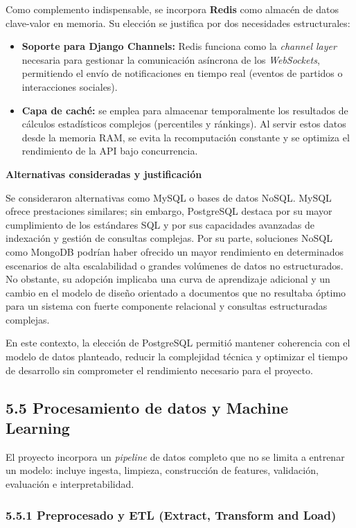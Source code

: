Como complemento indispensable, se incorpora \textbf{Redis} como almacén de datos clave-valor en memoria. Su elección se justifica por dos necesidades estructurales:
\begin{itemize}
    \item \textbf{Soporte para Django Channels:} Redis funciona como la \textit{channel layer} necesaria para gestionar la comunicación asíncrona de los \textit{WebSockets}, permitiendo el envío de notificaciones en tiempo real (eventos de partidos o interacciones sociales).
    \item \textbf{Capa de caché:} se emplea para almacenar temporalmente los resultados de cálculos estadísticos complejos (percentiles y ránkings). Al servir estos datos desde la memoria RAM, se evita la recomputación constante y se optimiza el rendimiento de la API bajo concurrencia.
\end{itemize}

\textbf{Alternativas consideradas y justificación}

Se consideraron alternativas como MySQL o bases de datos NoSQL. MySQL ofrece prestaciones similares; 
sin embargo, PostgreSQL destaca por su mayor cumplimiento de los estándares SQL y por sus capacidades 
avanzadas de indexación y gestión de consultas complejas. Por su parte, soluciones NoSQL como MongoDB 
podrían haber ofrecido un mayor rendimiento en determinados escenarios de alta escalabilidad o grandes 
volúmenes de datos no estructurados. No obstante, su adopción implicaba una curva de aprendizaje 
adicional y un cambio en el modelo de diseño orientado a documentos que no resultaba óptimo para un 
sistema con fuerte componente relacional y consultas estructuradas complejas.

En este contexto, la elección de PostgreSQL permitió mantener coherencia con el modelo de datos 
planteado, reducir la complejidad técnica y optimizar el tiempo de desarrollo sin comprometer el 
rendimiento necesario para el proyecto.

\subsection{5.5 Procesamiento de datos y Machine Learning}

El proyecto incorpora un \textit{pipeline} de datos completo que no se limita a entrenar un modelo: incluye 
ingesta, limpieza, construcción de features, validación, evaluación e interpretabilidad.

\subsubsection{5.5.1 Preprocesado y ETL (Extract, Transform and Load)}

